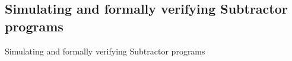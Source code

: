 \subsection{Simulating and formally verifying Subtractor programs}

Simulating and formally verifying Subtractor programs











